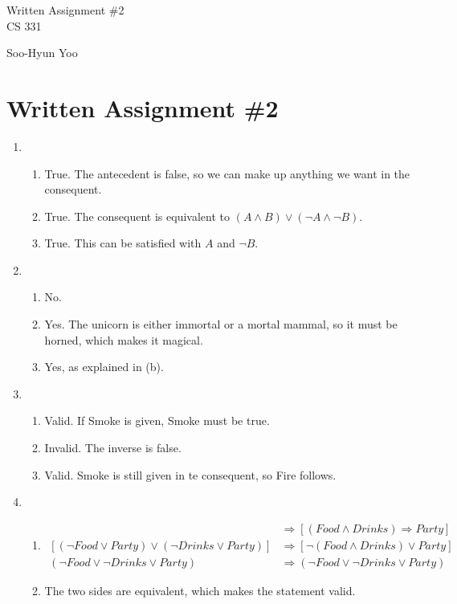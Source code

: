 \documentclass[10pt,letterpaper]{article}
\begin{document}
\begin{titlepage}
	\vspace*{4cm}
	\begin{flushright}
	{\huge
		Written Assignment \#2 \\ [3cm]
	}
	{\large
		CS 331
	}
	\end{flushright}

	\begin{flushright}
	Soo-Hyun Yoo
	\end{flushright}
\end{titlepage}

\section*{Written Assignment \#2}

\begin{enumerate}
	\item
		\begin{enumerate}
			\item True. The antecedent is false, so we can make up
				anything we want in the consequent.
			\item True. The consequent is equivalent to $(A \land B) \lor (\neg A \land \neg B)$.
			\item True. This can be satisfied with $A$ and $\neg B$.
		\end{enumerate}

	\item
		\begin{enumerate}
			\item No.
			\item Yes. The unicorn is either immortal or a mortal mammal, so it must be horned, which makes it magical.
			\item Yes, as explained in (b).
		\end{enumerate}

	\item
		\begin{enumerate}
			\item Valid. If Smoke is given, Smoke must be true.
			\item Invalid. The inverse is false.
			\item Valid. Smoke is still given in te consequent, so Fire follows.
		\end{enumerate}

	\item
		\begin{enumerate}
			\item
				\begin{align*}
					[(Food \Rightarrow Party) \lor (Drinks \Rightarrow Party)] &\Rightarrow [(Food \land Drinks) \Rightarrow Party] \\
					[(\neg Food \lor Party) \lor (\neg Drinks \lor Party)] &\Rightarrow [\neg (Food \land Drinks) \lor Party] \\
					(\neg Food \lor \neg Drinks \lor Party) &\Rightarrow (\neg Food \lor \neg Drinks \lor Party)
				\end{align*}
			\item The two sides are equivalent, which makes the statement valid.
		\end{enumerate}
\end{enumerate}
\end{document}
